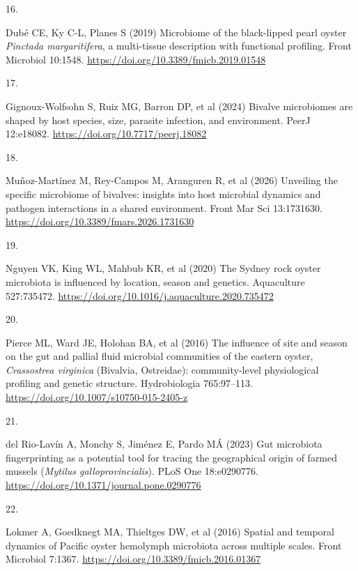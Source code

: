 \documentclass[
  12 pt,
]{article}
\newlength{\cslhangindent}
\newlength{\csllabelwidth}
\newenvironment{CSLReferences}[2] %
 {\begin{list}{}{%
  \setlength{\itemindent}{0pt}
  \setlength{\leftmargin}{0pt}
  \setlength{\parsep}{0pt}
  \ifodd #1
   \setlength{\leftmargin}{\cslhangindent}
   \setlength{\itemindent}{-1\cslhangindent}
  \fi
  \setlength{\itemsep}{#2\baselineskip}}}
 {\end{list}}
\newcommand{\CSLLeftMargin}[1]{\parbox[t]{\csllabelwidth}{\strut#1\strut}}
\newcommand{\CSLRightInline}[1]{\parbox[t]{\linewidth - \csllabelwidth}{\strut#1\strut}}
\begin{document}
\begin{CSLReferences}{0}{0}
\CSLLeftMargin{16. }%
\CSLRightInline{Dubé CE, Ky C-L, Planes S (2019) Microbiome of the black-lipped pearl oyster {{\emph{Pinctada margaritifera}}}, a multi-tissue description with functional profiling. Front Microbiol 10:1548. \url{https://doi.org/10.3389/fmicb.2019.01548}}

\CSLLeftMargin{17. }%
\CSLRightInline{Gignoux-Wolfsohn S, Ruiz MG, Barron DP, et al (2024) Bivalve microbiomes are shaped by host species, size, parasite infection, and environment. PeerJ 12:e18082. \url{https://doi.org/10.7717/peerj.18082}}

\CSLLeftMargin{18. }%
\CSLRightInline{Muñoz-Martínez M, Rey-Campos M, Aranguren R, et al (2026) Unveiling the specific microbiome of bivalves: insights into host microbial dynamics and pathogen interactions in a shared environment. Front Mar Sci 13:1731630. \url{https://doi.org/10.3389/fmars.2026.1731630}}

\CSLLeftMargin{19. }%
\CSLRightInline{Nguyen VK, King WL, Mahbub KR, et al (2020) The {Sydney} rock oyster microbiota is influenced by location, season and genetics. Aquaculture 527:735472. \url{https://doi.org/10.1016/j.aquaculture.2020.735472}}

\CSLLeftMargin{20. }%
\CSLRightInline{Pierce ML, Ward JE, Holohan BA, et al (2016) The influence of site and season on the gut and pallial fluid microbial communities of the eastern oyster, {{\emph{Crassostrea virginica}}} ({Bivalvia}, {Ostreidae}): community-level physiological profiling and genetic structure. Hydrobiologia 765:97--113. \url{https://doi.org/10.1007/s10750-015-2405-z}}

\CSLLeftMargin{21. }%
\CSLRightInline{del Rio-Lavín A, Monchy S, Jiménez E, Pardo MÁ (2023) Gut microbiota fingerprinting as a potential tool for tracing the geographical origin of farmed mussels ({{\emph{Mytilus galloprovincialis}}}). PLoS One 18:e0290776. \url{https://doi.org/10.1371/journal.pone.0290776}}

\CSLLeftMargin{22. }%
\CSLRightInline{Lokmer A, Goedknegt MA, Thieltges DW, et al (2016) Spatial and temporal dynamics of {Pacific} oyster hemolymph microbiota across multiple scales. Front Microbiol 7:1367. \url{https://doi.org/10.3389/fmicb.2016.01367}}


\end{CSLReferences}
\end{document}
